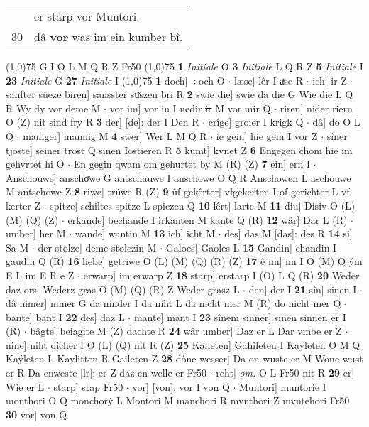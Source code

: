 \documentclass[8pt,a4paper,notitlepage]{article}
\begin{document}
\begin{table}[ht]
\begin{minipage}[t]{0.5\linewidth}
\begin{tabular}{rl}
 & er starp vor Muntori.\\ 
30 & dâ \textbf{vor} was im ein kumber bî.\\ 
\end{tabular}
\scriptsize
\line(1,0){75} \newline
G I O L M Q R Z Fr50 \newline
\line(1,0){75} \newline
\textbf{1} \textit{Initiale} O  \textbf{3} \textit{Initiale} L Q R Z  \textbf{5} \textit{Initiale} I  \textbf{23} \textit{Initiale} G  \textbf{27} \textit{Initiale} I  \newline
\line(1,0){75} \newline
\textbf{1} doch] ÷och O  $\cdot$ læse] lêr I aͯse R  $\cdot$ ich] ir Z  $\cdot$ sanfter süeze biren] sansster suͯszen bri R \textbf{2} swie die] swie da die G Wie die L Q R Wy dy vor deme M  $\cdot$ vor im] vor in I nedir \sout{ir} M vor mir Q  $\cdot$ riren] nider riern O (Z) nit sind fry R \textbf{3} der] [de]: der I Den R  $\cdot$ crîge] groier I krigk Q  $\cdot$ dâ] do O L Q  $\cdot$ maniger] mannig M \textbf{4} swer] Wer L M Q R  $\cdot$ ie gein] hie gein I vor Z  $\cdot$ sîner tjoste] seiner trost Q sinen Iostieren R \textbf{5} kumt] kvnet Z \textbf{6} Engegen chom hie im gehvrtet hi O  $\cdot$ En gegin qwam om gehurtet by M (R) (Z) \textbf{7} ein] ern I  $\cdot$ Anschouwe] anschoͮwe G antschauwe I anschowe O Q R Anschowen L aschouwe M antschowe Z \textbf{8} riwe] trúwe R (Z) \textbf{9} ûf gekêrter] vfgekerten I of gerichter L vf kerter Z  $\cdot$ spitze] schiltes spitze L spiczen Q \textbf{10} lêrt] larte M \textbf{11} diu] Disiv O (L) (M) (Q) (Z)  $\cdot$ erkande] bechande I irkanten M kante Q (R) \textbf{12} wâr] Dar L (R)  $\cdot$ umber] her M  $\cdot$ wande] wantin M \textbf{13} ich] icht M  $\cdot$ des] das M [das]: des R \textbf{14} si] Sa M  $\cdot$ der stolze] deme stolczin M  $\cdot$ Galoes] Gaoles L \textbf{15} Gandin] chandin I gaudin Q (R) \textbf{16} liebe] getriwe O (L) (M) (Q) (R) (Z) \textbf{17} ê im] im I O (M) Q ým E L im E R e Z  $\cdot$ erwarp] im erwarp Z \textbf{18} starp] erstarp I (O) L Q (R) \textbf{20} Weder daz ors] Wederz gras O (M) (Q) (R) Z Weder grasz L  $\cdot$ den] der I \textbf{21} sîn] sinen I  $\cdot$ dâ nimer] nimer G da ninder I da niht L da nicht mer M (R) do nicht mer Q  $\cdot$ bante] bant I \textbf{22} des] daz L  $\cdot$ mante] mant I \textbf{23} sînem sinner] sinen sinnen er I (R)  $\cdot$ bâgte] beiagite M (Z) dachte R \textbf{24} wâr umber] Daz er L Dar vmbe er Z  $\cdot$ nine] niht dicher I O (L) (Q) nit R (Z) \textbf{25} Kaileten] Gahileten I Kayleten O M Q Kaýleten L Kaylitten R Gaileten Z \textbf{28} dône wesser] Da on wuste er M Wone wust er R Da enweste [lr]: er Z daz en welle er Fr50  $\cdot$ reht] \textit{om.} O L Fr50 nit R \textbf{29} er] Wie er L  $\cdot$ starp] stap Fr50  $\cdot$ vor] [von]: vor I von Q  $\cdot$ Muntori] muntorie I monthori O Q monchorẏ L Montori M manchori R mvnthori Z mvntehori Fr50 \textbf{30} vor] von Q \newline

\end{minipage}
\end{table}
\end{document}
